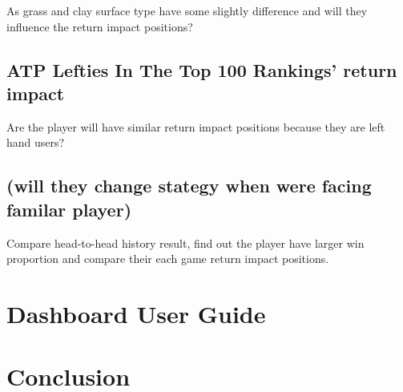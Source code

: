 \documentclass[11pt,a4paper,]{article}
\begin{document}
As grass and clay surface type have some slightly difference and will they influence the return impact positions?

\hypertarget{atp-lefties-in-the-top-100-rankings-return-impact}{%
\subsection{ATP Lefties In The Top 100 Rankings' return impact}\label{atp-lefties-in-the-top-100-rankings-return-impact}}

Are the player will have similar return impact positions because they are left hand users?

\hypertarget{will-they-change-stategy-when-were-facing-familar-player}{%
\subsection{(will they change stategy when were facing familar player)}\label{will-they-change-stategy-when-were-facing-familar-player}}

Compare head-to-head history result, find out the player have larger win proportion and compare their each game return impact positions.

\hypertarget{dashboard-user-guide}{%
\section{Dashboard User Guide}\label{dashboard-user-guide}}

\hypertarget{conclusion}{%
\section{Conclusion}\label{conclusion}}

\printbibliography[title=Reference]
\end{document}
